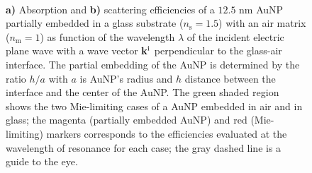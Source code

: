 \begin{figure}[b!]
    \hspace*{-21em}%
    \vspace*{-1.25em}%
        \begin{subfigure}{.715\textwidth}\caption{ }\label{sfig:IncNormal:1}\end{subfigure}%
        \begin{subfigure}{.25\textwidth}\caption{ }\label{sfig:IncNormal:2}\end{subfigure} \\
    \def\svgwidth{.95\textwidth}
    \small
    \centering
    \vspace*{-.5em}
    \caption[Absorption and Scattering Efficiencies of a partially embedded 12.5 nm AuNP into a substrate Illuminated in an internal configuration at normal incidence]{\textbf{a)} Absorption and \textbf{b)} scattering efficiencies of a $12.5$ nm AuNP partially embedded in a glass substrate ($n_\text{s} = 1.5$) with an air matrix ($n_\text{m} = 1$) as function of the wavelength $\lambda$ of the incident electric plane wave with a wave vector $\vb{k}^\text{i}$ perpendicular to the glass-air interface. The partial embedding of the AuNP is determined by the ratio $h/a$ with $a$ is AuNP's radius and $h$ distance between the interface and the center of the AuNP. The green shaded region shows the two Mie-limiting cases of a AuNP embedded in air and in glass; the magenta (partially embedded AuNP) and red (Mie-limiting) markers corresponds to the efficiencies evaluated at the wavelength of resonance for each case; the gray dashed line is a guide to the eye.}
    \label{fig:Inc:Eff}
\end{figure}

